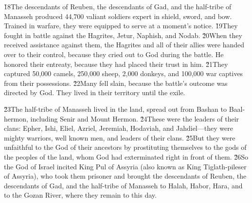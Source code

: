 \v{18}The descendants of Reuben, the descendants of Gad, and the half-tribe of Manasseh produced 44,700 valiant soldiers expert in shield, sword, and bow. Trained in warfare, they were equipped to serve at a moment's notice. \v{19}They fought in battle against the Hagrites, Jetur, Naphish, and Nodab. \v{20}When they received assistance against them, the Hagrites and all of their allies were handed over to their control, because they cried out to God during the battle. He honored their entreaty, because they had placed their trust in him. \v{21}They captured 50,000 camels, 250,000 sheep, 2,000 donkeys, and 100,000 war captives from their possessions. \v{22}Many fell slain, because the battle's outcome was directed by God. They lived in their territory until the exile.

\v{23}The half-tribe of Manasseh lived in the land, spread out from Bashan to Baal-hermon, including Senir and Mount Hermon. \v{24}These were the leaders of their clans: Epher, Ishi, Eliel, Azriel, Jeremiah, Hodaviah, and Jahdiel---they were mighty warriors, well known men, and leaders of their clans. \v{25}But they were unfaithful to the God of their ancestors by prostituting themselves to the gods of the peoples of the land, whom God had exterminated right in front of them. \v{26}So the God of Israel incited King Pul of Assyria (also known as King Tiglath-pileser of Assyria), who took them prisoner and brought the descendants of Reuben, the descendants of Gad, and the half-tribe of Manasseh to Halah, Habor, Hara, and to the Gozan River, where they remain to this day.

